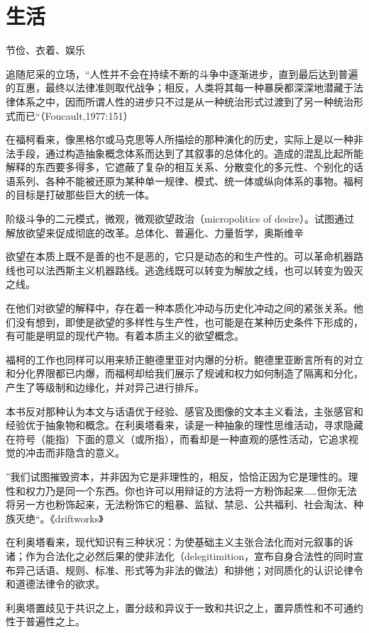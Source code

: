 \section{生活}节俭、衣着、娱乐


追随尼采的立场，“人性并不会在持续不断的斗争中逐渐进步，直到最后达到普遍的互惠，最终以法律准则取代战争；相反，人类将其每一种暴戾都深深地潜藏于法律体系之中，因而所谓人性的进步只不过是从一种统治形式过渡到了另一种统治形式而已“（Foucault,1977:151）


在福柯看来，像黑格尔或马克思等人所描绘的那种演化的历史，实际上是以一种非法手段，通过构造抽象概念体系而达到了其叙事的总体化的。造成的混乱比起所能解释的东西要多得多，它遮蔽了复杂的相互关系、分散变化的多元性、个别化的话语系列、各种不能被还原为某种单一规律、模式、统一体或纵向体系的事物。福柯的目标是打破那些巨大的统一体。

阶级斗争的二元模式，微观，微观欲望政治（micropolitics of desire）。试图通过解放欲望来促成彻底的改革。总体化、普遍化、力量哲学，奥斯维辛

欲望在本质上既不是善的也不是恶的，它只是动态的和生产性的。可以革命机器路线也可以法西斯主义机器路线。逃逸线既可以转变为解放之线，也可以转变为毁灭之线。

在他们对欲望的解释中，存在着一种本质化冲动与历史化冲动之间的紧张关系。他们没有想到，即使是欲望的多样性与生产性，也可能是在某种历史条件下形成的，有可能是明显的现代产物。有着本质主义的欲望概念。

福柯的工作也同样可以用来矫正鲍德里亚对内爆的分析。鲍德里亚断言所有的对立和分化界限都已内爆，而福柯却给我们展示了规诫和权力如何制造了隔离和分化，产生了等级制和边缘化，并对异己进行排斥。



本书反对那种认为本文与话语优于经验、感官及图像的文本主义看法，主张感官和经验优于抽象物和概念。在利奥塔看来，读是一种抽象的理性思维活动，寻求隐藏在符号（能指）下面的意义（或所指），而看却是一种直观的感性活动，它追求视觉的冲击而非隐含的意义。

”我们试图摧毁资本，并非因为它是非理性的，相反，恰恰正因为它是理性的。理性和权力乃是同一个东西。你也许可以用辩证的方法将一方粉饰起来……但你无法将另一方也粉饰起来，无法粉饰它的粗暴、监狱、禁忌、公共福利、社会淘汰、种族灭绝“。《driftworks》

在利奥塔看来，现代知识有三种状况：为使基础主义主张合法化而对元叙事的诉诸；作为合法化之必然后果的使非法化（delegitimition，宣布自身合法性的同时宣布异己话语、规则、标准、形式等为非法的做法）和排他；对同质化的认识论律令和道德法律令的欲求。

利奥塔置歧见于共识之上，置分歧和异议于一致和共识之上，置异质性和不可通约性于普遍性之上。

